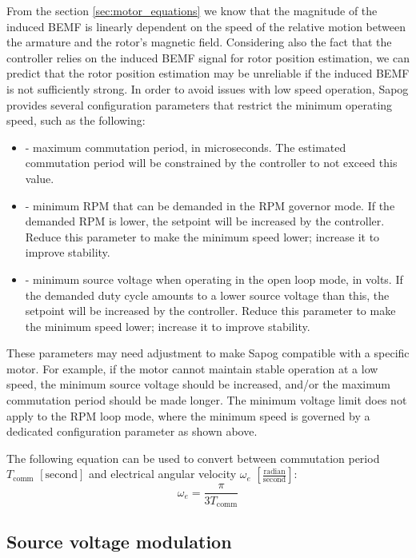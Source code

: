 \documentclass{zubaxdoc}
\begin{document}
From the section \ref{sec:motor_equations} we know that the magnitude of the induced BEMF is linearly
dependent on the speed of the relative motion between the armature and the rotor's magnetic field.
Considering also the fact that the controller relies on the induced BEMF signal for rotor position estimation,
we can predict that the rotor position estimation may be unreliable if the induced BEMF is not sufficiently
strong.
In order to avoid issues with low speed operation, Sapog provides several configuration parameters that
restrict the minimum operating speed, such as the following:

\begin{itemize}
\item {} - maximum commutation period, in microseconds.
The estimated commutation period will be constrained by the controller to not exceed this value.
\item {} - minimum RPM that can be demanded in the RPM governor mode.
If the demanded RPM is lower, the setpoint will be increased by the controller.
Reduce this parameter to make the minimum speed lower; increase it to improve stability.
\item {} - minimum source voltage when operating in the open loop mode, in volts.
If the demanded duty cycle amounts to a lower source voltage than this, the setpoint will be
increased by the controller.
Reduce this parameter to make the minimum speed lower; increase it to improve stability.
\end{itemize}

These parameters may need adjustment to make Sapog compatible with a specific motor.
For example, if the motor cannot maintain stable operation at a low speed,
the minimum source voltage should be increased,
and/or the maximum commutation period should be made longer.
The minimum voltage limit does not apply to the RPM loop mode,
where the minimum speed is governed by a dedicated configuration parameter as shown above.

The following equation can be used to convert between commutation period $T_\text{comm}$
$\left[\text{second}\right]$
and electrical angular velocity $\omega_e$ $\left[\frac{\text{radian}}{\text{second}}\right]$:
\begin{equation}
\omega_e = \frac{\pi}{3 T_\text{comm}}
\end{equation}

\subsection{Source voltage modulation}
\end{document}
